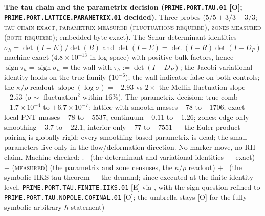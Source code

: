 \documentclass[11pt,a4paper]{article}
\theoremstyle{definition}
\begin{document}
\par\smallskip\noindent\textbf{The tau chain and the parametrix
decision (\texttt{PRIME.PORT.\allowbreak TAU.01} [O];
\texttt{PRIME.PORT.LATTICE.\allowbreak PARAMETRIX.01} decided).}
Three probes ($5/5 + 3/3 + 3/3$; \textsc{tau-chain-exact},
\textsc{parametrix-measured (fluctuations-required)},
\textsc{zones-measured (both-required)}; embedded byte-exact).
The Schur determinant identities $\sigma_h = \det(I -
E)/\det(B)$ and $\det(I - E) = \det(I - R)\det(I - D_P)$
machine-exact ($4.8\times10^{-13}$ in log space) with positive
bulk factors, hence $\operatorname{sign}\tau_h =
\operatorname{sign}\sigma_h$ = the wall with $\tau_h := \det(I -
D_P)$; the Jacobi variational identity holds on the true family
($10^{-6}$); the wall indicator false on both controls; the
$\kappa/\rho$ readout $\operatorname{slope}(\log\sigma) = -2.93$
vs $2\times$ the Mellin fluctuation slope $-2.53$ ($\sigma \sim$
fluctuation$^2$ within $16\%$).  The parametrix decision: true
comb $+1.7\times10^{-4}$ to $+6.7\times10^{-7}$; lattice with
smooth masses $-78$ to $-1706$; exact local-PNT masses $-78$ to
$-5537$; continuum $-0.11$ to $-1.26$; zones: edge-only
smoothing $-3.7$ to $-22.1$, interior-only $-77$ to $-7551$ ---
the Euler-product pairing is globally rigid; every
smoothing-based parametrix is dead; the small parameters live
only in the flow/deformation direction.  No marker move, no RH
claim.
Machine-checked: .
\mE\ (the determinant and variational identities --- exact) $+$
(\textsc{measured}) (the parametrix and zone censuses, the
$\kappa/\rho$ readout) $+$ \mO\ (the symbolic IIKS tau theorem
--- the demand; since executed at the finite-identity level,
\texttt{PRIME.PORT.TAU.FINITE.IIKS.01} [E] via
, with the sign
question refined to \texttt{PRIME.PORT.TAU.NOPOLE.COFINAL.01}
[O]; the umbrella stays [O] for the fully symbolic
arbitrary-$h$ statement)
\par\smallskip
\end{document}
